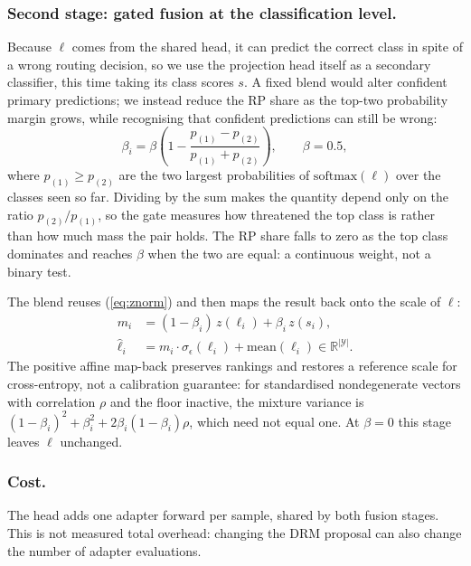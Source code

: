 \documentclass[runningheads]{llncs}
\begin{document}
\subsubsection{Second stage: gated fusion at the classification level.}
Because $\ell$ comes from the shared head, it can predict the correct
class in spite of a wrong routing decision, so we use the projection head itself
as a secondary classifier, this time taking its class scores $s$. A fixed blend
would alter confident primary predictions; we instead reduce the RP share as the
top-two probability margin grows, while recognising that confident predictions
can still be wrong:
\begin{equation}
\beta_i = \beta \left( 1 - \frac{p_{(1)} - p_{(2)}}{p_{(1)} + p_{(2)}} \right),
\qquad \beta = 0.5 ,
\label{eq:gate}
\end{equation}
where $p_{(1)} \geq p_{(2)}$ are the two largest probabilities of
$\mathrm{softmax}(\ell)$ over the classes seen so far. Dividing by the sum makes
the quantity depend only on the ratio $p_{(2)}/p_{(1)}$, so the gate measures how
threatened the top class is rather than how much mass the pair holds. The RP share falls to zero as the top
class dominates and reaches $\beta$ when the two are equal: a continuous weight,
not a binary test.

The blend reuses (\ref{eq:znorm}) and then maps the result back onto the scale of
$\ell$:
\begin{align}
m_i &= (1 - \beta_i)\, z(\ell_i) + \beta_i\, z(s_i),
\label{eq:mix}\\
\hat{\ell}_i &= m_i \cdot \sigma_\epsilon(\ell_i) + \mathrm{mean}(\ell_i)
   \in \mathbb{R}^{|\mathcal{Y}|}.
\label{eq:affine}
\end{align}
The positive affine map-back preserves rankings and restores a reference scale
for cross-entropy, not a calibration guarantee: for standardised nondegenerate
vectors with correlation $\rho$ and the floor inactive, the mixture variance is
$(1-\beta_i)^2+\beta_i^2+2\beta_i(1-\beta_i)\rho$, which need not equal one. At
$\beta=0$ this stage leaves $\ell$ unchanged.

\subsubsection{Cost.}
The head adds one adapter forward per sample, shared by both fusion stages.
This is not measured total overhead: changing the DRM proposal can also change
the number of adapter evaluations.
\end{document}
